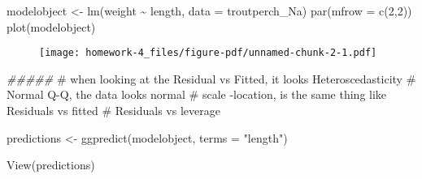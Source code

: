 \documentclass[
  letterpaper,
  DIV=11,
  numbers=noendperiod]{scrartcl}
\newenvironment{Shaded}{\begin{snugshade}}{\end{snugshade}}
\newcommand{\AttributeTok}[1]{\textcolor[rgb]{0.40,0.45,0.13}{#1}}
\newcommand{\CommentTok}[1]{\textcolor[rgb]{0.37,0.37,0.37}{#1}}
\newcommand{\DecValTok}[1]{\textcolor[rgb]{0.68,0.00,0.00}{#1}}
\newcommand{\DocumentationTok}[1]{\textcolor[rgb]{0.37,0.37,0.37}{\textit{#1}}}
\newcommand{\FunctionTok}[1]{\textcolor[rgb]{0.28,0.35,0.67}{#1}}
\newcommand{\NormalTok}[1]{\textcolor[rgb]{0.00,0.23,0.31}{#1}}
\newcommand{\OtherTok}[1]{\textcolor[rgb]{0.00,0.23,0.31}{#1}}
\newcommand{\SpecialCharTok}[1]{\textcolor[rgb]{0.37,0.37,0.37}{#1}}
\newcommand{\StringTok}[1]{\textcolor[rgb]{0.13,0.47,0.30}{#1}}
\begin{document}
\begin{Shaded}
\begin{Highlighting}[]
\NormalTok{modelobject }\OtherTok{\textless{}{-}} \FunctionTok{lm}\NormalTok{(weight }\SpecialCharTok{\textasciitilde{}}\NormalTok{ length, }\AttributeTok{data =}\NormalTok{ troutperch\_Na)}
\FunctionTok{par}\NormalTok{(}\AttributeTok{mfrow =} \FunctionTok{c}\NormalTok{(}\DecValTok{2}\NormalTok{,}\DecValTok{2}\NormalTok{))}
\FunctionTok{plot}\NormalTok{(modelobject)}
\end{Highlighting}
\end{Shaded}

\begin{figure}[H]

{\centering \texttt{[image: homework-4\_files/figure-pdf/unnamed-chunk-2-1.pdf]}

}

\end{figure}

\begin{Shaded}
\begin{Highlighting}[]
\DocumentationTok{\#\#\#\#\#}
\CommentTok{\# when looking at the Residual vs Fitted, it looks Heteroscedasticity }
\CommentTok{\# Normal Q{-}Q, the data looks normal }
\CommentTok{\# scale {-}location, is the same thing like Residuals vs fitted }
\CommentTok{\# Residuals vs leverage }
\end{Highlighting}
\end{Shaded}

\begin{Shaded}
\begin{Highlighting}[]
\NormalTok{predictions }\OtherTok{\textless{}{-}} \FunctionTok{ggpredict}\NormalTok{(modelobject, }\AttributeTok{terms =} \StringTok{"length"}\NormalTok{)}

\FunctionTok{View}\NormalTok{(predictions)}
\end{Highlighting}
\end{Shaded}
\end{document}

